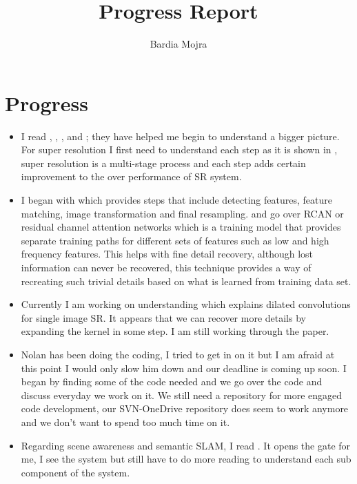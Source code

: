 \documentclass[11pt]{article}
\title{Progress Report}
\author{Bardia Mojra}
\begin{document}
	\maketitle
	\thispagestyle{empty}



\section{Progress}
\begin{itemize}
  \item I read \cite{DLSISR}, \cite{DCSR}, \cite{ImRegSurvey},\cite{discoman} and \cite{ImSRwVDRCAN}; they have helped me begin to understand a bigger picture. For super resolution I first need to understand each step as it is shown in \cite{DLSISR}, super resolution is a multi-stage process and each step adds certain improvement to the over performance of SR system. 
  
  \item I began with \cite{ImRegSurvey} which provides steps that include detecting features, feature matching, image transformation and final resampling. \cite{ImSRwVDRCAN} and \cite{RCANforImClass} go over RCAN or residual channel attention networks which is a training model that provides separate training paths for different sets of features such as low and high frequency features. This helps with fine detail recovery, although lost information can never be recovered, this technique provides a way of recreating such trivial details based on what is learned from training data set. 
  
  \item Currently I am working on understanding \cite{DCSR} which explains dilated convolutions for single image SR. It appears that we can recover more details by expanding the kernel in some step. I am still working through the paper. 
  
  \item Nolan has been doing the coding, I tried to get in on it but I am afraid at this point I would only slow him down and our deadline is coming up soon. I began by finding some of the code needed and we go over the code and discuss everyday we work on it. We still need a repository for more engaged code development, our SVN-OneDrive repository does seem to work anymore and we don't want to spend too much time on it. 
      
  \item Regarding scene awareness and semantic SLAM, I read \cite{discoman}. It opens the gate for me, I see the system but still have to do more reading to understand each sub component of the system. 

\end{itemize}
\end{document}
